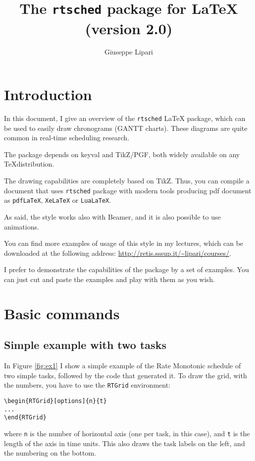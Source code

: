 \documentclass{article}
\title{The \texttt{rtsched} package for \LaTeX \\ (version 2.0)}
\author{Giuseppe Lipari}
\begin{document}
\maketitle

\listoffigures

\section{Introduction}

In this document, I give an overview of the \texttt{rtsched} \LaTeX
package, which can be used to easily draw chronograms (GANTT charts).
These diagrams are quite common in real-time scheduling research.

The package depends on keyval and TikZ/PGF, both widely
available on any \TeX distribution.

The drawing capabilities are completely based on TikZ. Thus, you can compile
 a document that uses \texttt{rtsched} package with modern tools producing pdf document
as \texttt{pdfLaTeX}, \texttt{XeLaTeX} or \texttt{LuaLaTeX}.

As said, the style works also with Beamer, and it is also possible to
use animations.

You can find more examples of usage of this style in my lectures,
which can be downloaded at the following address:
\url{http://retis.sssup.it/~lipari/courses/}.

I prefer to demonstrate the capabilities of the package by a set of
examples. You can just cut and paste the examples and play with them
as you wish.

\section{Basic commands}

\subsection{Simple example with two tasks}

In Figure \ref{fig:ex1} I show a simple example of the Rate Monotonic
schedule of two simple tasks, followed by the code that generated it.
To draw the grid, with the numbers, you have to use the
\texttt{RTGrid} environment:
\begin{verbatim}
\begin{RTGrid}[options]{n}{t}
...
\end{RTGrid}
\end{verbatim}
\noindent where \texttt{n} is the number of horizontal axis (one per
task, in this case), and \texttt{t} is the length of the axis in time
units. This also draws the task labels on the left, and the numbering
on the bottom.
\end{document}
